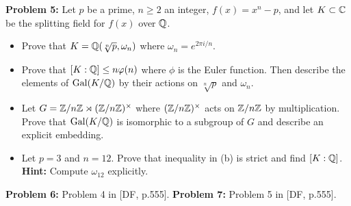 \documentclass[11pt]{amsart}
\begin{document}
\skv
{\bf Problem 5:} \rm 
Let $p$ be a prime, $n\geq 2$ an integer, $f(x)=x^n-p$, and let
$K\subset {\mathbb C}$ be the splitting field for $f(x)$ over ${\mathbb Q}$.
\begin{itemize}
\item[(a)] Prove that $K={\mathbb Q}(\sqrt[n]{p},\omega_n)$ where
$\omega_n=e^{2\pi i/n}$.
\item[(b)] Prove that $[K:{\mathbb Q}]\leq n\varphi(n)$ where $\phi$
is the Euler function. Then describe the elements of ${\rm Gal}(K/{\mathbb Q})$ by their actions on $\sqrt[n]{p}$
and $\omega_n$.
\item[(c)] Let $G={\mathbb Z}/n{\mathbb Z}\rtimes ({\mathbb Z}/n{\mathbb Z})^{\times}$ where 
$({\mathbb Z}/n{\mathbb Z})^{\times}$
acts on ${\mathbb Z}/n{\mathbb Z}$ by multiplication. Prove that ${\rm Gal}(K/{\mathbb Q})$ is isomorphic
to a subgroup of $G$ and describe an explicit embedding.
\item[(d)] Let $p=3$ and $n=12$. Prove that inequality in (b)
is strict and find $[K:{\mathbb Q}]$. {\bf Hint:} Compute $\omega_{12}$
explicitly.
\end{itemize}


\skv
{\bf Problem 6:} Problem 4 in [DF, p.555].
\skv
{\bf Problem 7:} Problem 5 in [DF, p.555].
\skv
\end{document}
